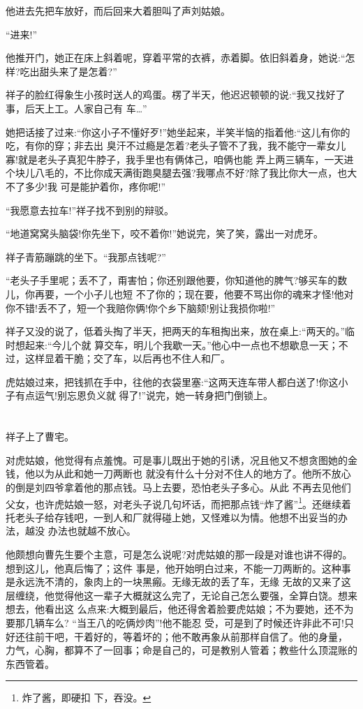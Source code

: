 \documentclass[11pt,a4paper,onecolumn]{article}
\begin{document}
他进去先把车放好，而后回来大着胆叫了声刘姑娘。

``进来!''

他推开门，她正在床上斜着呢，穿着平常的衣裤，赤着脚。依旧斜着身，她说:``怎样?吃出甜头来了是怎着?''

祥子的脸红得象生小孩时送人的鸡蛋。楞了半天，他迟迟顿顿的说:``我又找好了事，后天上工。人家自己有
车\ldots ''

她把话接了过来:``你这小子不懂好歹!''她坐起来，半笑半恼的指着他:``这儿有你的吃，有你的穿；非去出
臭汗不过瘾是怎着?老头子管不了我，我不能守一辈女儿寡!就是老头子真犯牛脖子，我手里也有俩体己，咱俩也能
弄上两三辆车，一天进个块儿八毛的，不比你成天满街跑臭腿去强?我哪点不好?除了我比你大一点，也大不了多少!我
可是能护着你，疼你呢!''

``我愿意去拉车!''祥子找不到别的辩驳。

``地道窝窝头脑袋!你先坐下，咬不着你!''她说完，笑了笑，露出一对虎牙。

祥子青筋蹦跳的坐下。``我那点钱呢?''

``老头子手里呢；丢不了，甭害怕；你还别跟他要，你知道他的脾气?够买车的数儿，你再要，一个小子儿也短
不了你的；现在要，他要不骂出你的魂来才怪!他对你不错!丢不了，短一个我赔你俩!你个乡下脑颏!别让我损你啦!''

祥子又没的说了，低着头掏了半天，把两天的车租掏出来，放在桌上:``两天的。''临时想起来:``今儿个就
算交车，明儿个我歇一天。''他心中一点也不想歇息一天；不过，这样显着干脆；交了车，以后再也不住人和厂。

虎姑娘过来，把钱抓在手中，往他的衣袋里塞:``这两天连车带人都白送了!你这小子有点运气!别忘恩负义就
得了!''说完，她一转身把门倒锁上。

\pagebreak
\section{}

祥子上了曹宅。

对虎姑娘，他觉得有点羞愧。可是事儿既出于她的引诱，况且他又不想贪图她的金钱，他以为从此和她一刀两断也
就没有什么十分对不住人的地方了。他所不放心的倒是刘四爷拿着他的那点钱。马上去要，恐怕老头子多心。从此
不再去见他们父女，也许虎姑娘一怒，对老头子说几句坏话，而把那点钱``炸了酱''\footnote{炸了酱，即硬扣
  下，吞没。}。还继续着托老头子给存钱吧，一到人和厂就得碰上她，又怪难以为情。他想不出妥当的办法，越没
办法也就越不放心。

他颇想向曹先生要个主意，可是怎么说呢?对虎姑娘的那一段是对谁也讲不得的。想到这儿，他真后悔了；这件
事是，他开始明白过来，不能一刀两断的。这种事是永远洗不清的，象肉上的一块黑瘢。无缘无故的丢了车，无缘
无故的又来了这层缠绕，他觉得他这一辈子大概就这么完了，无论自己怎么要强，全算白饶。想来想去，他看出这
么点来:大概到最后，他还得舍着脸要虎姑娘；不为要她，还不为要那几辆车么? ``当王八的吃俩炒肉''!他不能忍
受，可是到了时候还许非此不可!只好还往前干吧，干着好的，等着坏的；他不敢再象从前那样自信了。他的身量，
力气，心胸，都算不了一回事；命是自己的，可是教别人管着；教些什么顶混账的东西管着。
\end{document}

